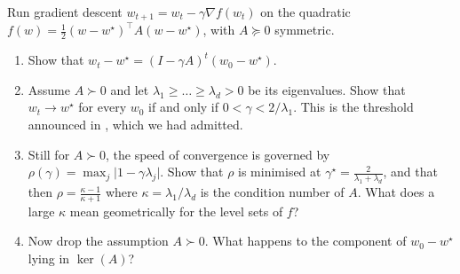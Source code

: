 \begin{exercise}[$\star\star$]
Run gradient descent $w_{t+1} = w_t - \gamma \nabla f(w_t)$ on the quadratic $f(w) =
\frac{1}{2}(w - w^\star)^\top A(w - w^\star)$, with $A \succeq 0$ symmetric.
\begin{enumerate}
    \item Show that $w_t - w^\star = (I - \gamma A)^t (w_0 - w^\star)$.
    \item Assume $A \succ 0$ and let $\lambda_1 \geq \dots \geq \lambda_d > 0$ be its
    eigenvalues. Show that $w_t \to w^\star$ for every $w_0$ if and only if $0 <
    \gamma < 2/\lambda_1$. This is the threshold announced in
    , which we had admitted.
    \item Still for $A \succ 0$, the speed of convergence is governed by $\rho(\gamma)
    = \max_j \vert 1 - \gamma \lambda_j \vert$. Show that $\rho$ is minimised at
    $\gamma^\star = \frac{2}{\lambda_1 + \lambda_d}$, and that then $\rho = \frac{\kappa -
    1}{\kappa + 1}$ where $\kappa = \lambda_1 / \lambda_d$ is the condition number of
    $A$. What does a large $\kappa$ mean geometrically for the level sets of $f$?
    \item Now drop the assumption $A \succ 0$. What happens to the component of $w_0 -
    w^\star$ lying in $\ker(A)$? 
\end{enumerate}
\end{exercise}




